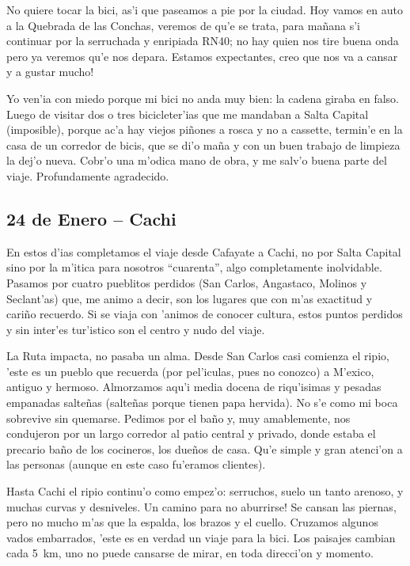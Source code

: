 No quiere tocar la bici, as'i que paseamos a pie por la ciudad. Hoy vamos en
auto a la Quebrada de las Conchas, veremos de qu'e se trata, para ma\~nana s'i
continuar por la serruchada y enripiada {\small RN}40; no hay quien nos
tire buena onda pero ya veremos qu'e nos depara. Estamos expectantes,
\textexclamdown creo que nos va a cansar y a gustar mucho!

Yo ven'ia con miedo porque mi bici no anda muy bien: la cadena giraba en falso.
Luego de visitar dos o tres bicicleter'ias que me mandaban a Salta Capital
(imposible), porque ac'a hay viejos pi\~nones a rosca y no a cassette, termin'e
en la casa de un corredor de bicis, que se di'o ma\~na y con un buen trabajo de
limpieza la dej'o nueva. Cobr'o una m'odica mano de obra, y me salv'o buena
parte del viaje. Profundamente agradecido.

\subsection*{24 de Enero -- Cachi}

En estos d'ias completamos el viaje desde Cafayate a Cachi, no por Salta Capital
sino por la m'itica para nosotros ``cuarenta'', algo completamente inolvidable.
Pasamos por cuatro pueblitos perdidos (San Carlos, Angastaco, Molinos y
Seclant'as) que, me animo a decir, son los lugares que con m'as exactitud y
cari\~no recuerdo. Si se viaja con 'animos de conocer cultura, estos puntos
perdidos y sin inter'es tur'istico son el centro y nudo del viaje.

La Ruta impacta, no pasaba un alma. Desde San Carlos casi comienza el ripio,
'este es un pueblo que recuerda (por pel'iculas, pues no conozco) a M'exico,
antiguo y hermoso. Almorzamos aqu'i media docena de riqu'isimas y pesadas
empanadas salte\~nas (salte\~nas porque tienen papa hervida). No s'e como mi
boca sobrevive sin quemarse. Pedimos por el ba\~no y, muy amablemente, nos
condujeron por un largo corredor al patio central y privado, donde estaba el
precario ba\~no de los cocineros, los due\~nos de casa. Qu'e simple y gran
atenci'on a las personas (aunque en este caso fu'eramos clientes).

Hasta Cachi el ripio continu'o como empez'o: serruchos, suelo un tanto arenoso,
y muchas curvas y desniveles. \textexclamdown Un camino para no aburrirse! Se
cansan las piernas, pero no mucho m'as que la espalda, los brazos y el cuello.
Cruzamos algunos vados embarrados, 'este es en verdad un viaje para la bici. Los
paisajes cambian cada 5~km, uno no puede cansarse de mirar, en toda direcci'on y
momento.


